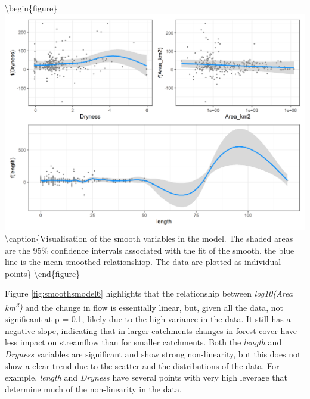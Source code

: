 \documentclass[]{elsarticle} %
\begin{document}
\textbackslash begin\{figure\}
\includegraphics[width=0.9\linewidth]{model6_smooths} \textbackslash caption\{Visualisation of the smooth variables in the model. The shaded areas are the 95\% confidence intervals associated with the fit of the smooth, the blue line is the mean smoothed relationshiop. The data are plotted as individual points\}\label{fig:smoothsmodel6}
\textbackslash end\{figure\}

Figure \ref{fig:smoothsmodel6} highlights that the relationship between \emph{log10(Area km\textsuperscript{2})} and the change in flow is essentially linear, but, given all the data, not significant at p = 0.1, likely due to the high variance in the data. It still has a negative slope, indicating that in larger catchments changes in forest cover have less impact on streamflow than for smaller catchments. Both the \emph{length} and \emph{Dryness} variables are significant and show strong non-linearity, but this does not show a clear trend due to the scatter and the distributions of the data. For example, \emph{length} and \emph{Dryness} have several points with very high leverage that determine much of the non-linearity in the data.
\end{document}
